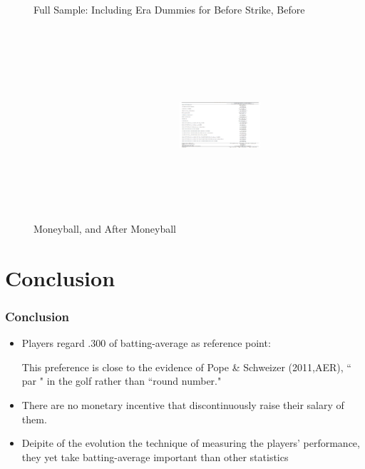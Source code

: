 \documentclass[dvipdfmx,12pt]{beamer}
\begin{document}
\begin{frame}
  \begin{figure}
    \scriptsize
    Full Sample:
    Including Era Dummies for Before Strike, Before Moneyball,
    and After Moneyball
    \includegraphics[width = 3cm, height = 8cm]{fig_tab/mt_tab6.pdf}

\label{}
  \end{figure}
\end{frame}

\section{Conclusion}
\begin{frame}\frametitle{Conclusion}
 \begin{itemize}
   \item Players regard .300 of batting-average as reference point:

   This preference is close to the evidence of Pope \& Schweizer (2011,AER),
   `` par " in the golf rather than ``round number."

   \item There are no monetary incentive that discontinuously raise their
   salary of them.

   \item Deipite of the evolution the technique of measuring the players'
   performance, they yet take batting-average important than other statistics
 \end{itemize}
\end{frame}
\end{document}
